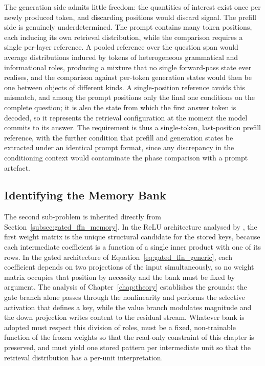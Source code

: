 The generation side admits little freedom: the quantities of interest exist
once per newly produced token, and discarding positions would discard
signal. The prefill side is genuinely underdetermined. The prompt contains
many token positions, each inducing its own retrieval distribution, while
the comparison requires a single per-layer reference. A pooled reference
over the question span would average distributions induced by tokens of
heterogeneous grammatical and informational roles, producing a mixture that
no single forward-pass state ever realises, and the comparison against
per-token generation states would then be one between objects of different
kinds. A single-position reference avoids this mismatch, and among the
prompt positions only the final one conditions on the complete question; it
is also the state from which the first answer token is decoded, so it
represents the retrieval configuration at the moment the model commits to
its answer. The requirement is thus a single-token, last-position prefill
reference, with the further condition that prefill and generation states be
extracted under an identical prompt format, since any discrepancy in the
conditioning context would contaminate the phase comparison with a prompt
artefact.

\subsection{Identifying the Memory Bank}
\label{subsec:pa_memory_bank}

The second sub-problem is inherited directly from
Section~\ref{subsec:gated_ffn_memory}. In the ReLU architecture analysed by
\citet{geva2021transformer}, the first weight matrix is the unique
structural candidate for the stored keys, because each intermediate
coefficient is a function of a single inner product with one of its rows. In
the gated architecture of Equation~\eqref{eq:gated_ffn_generic}, each
coefficient depends on two projections of the input simultaneously, so no
weight matrix occupies that position by necessity and the bank must be fixed
by argument. The analysis of Chapter~\ref{chap:theory} establishes the
grounds: the gate branch alone passes through the nonlinearity and performs
the selective activation that defines a key, while the value branch
modulates magnitude and the down projection writes content to the residual
stream. Whatever bank is adopted must respect this division of roles, must
be a fixed, non-trainable function of the frozen weights so that the
read-only constraint of this chapter is preserved, and must yield one stored
pattern per intermediate unit so that the retrieval distribution has a
per-unit interpretation.

